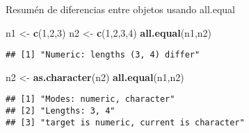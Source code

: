 \documentclass[ignorenonframetext,]{beamer}
\newenvironment{Shaded}{\begin{snugshade}}{\end{snugshade}}
\newcommand{\KeywordTok}[1]{\textcolor[rgb]{0.13,0.29,0.53}{\textbf{#1}}}
\newcommand{\DecValTok}[1]{\textcolor[rgb]{0.00,0.00,0.81}{#1}}
\newcommand{\StringTok}[1]{\textcolor[rgb]{0.31,0.60,0.02}{#1}}
\newcommand{\NormalTok}[1]{#1}
\begin{document}
\begin{frame}[fragile]{Resumén de diferencias entre objetos usando
all.equal}

\begin{Shaded}
\begin{Highlighting}[]
\NormalTok{n1 <-}\StringTok{ }\KeywordTok{c}\NormalTok{(}\DecValTok{1}\NormalTok{,}\DecValTok{2}\NormalTok{,}\DecValTok{3}\NormalTok{)}
\NormalTok{n2 <-}\StringTok{ }\KeywordTok{c}\NormalTok{(}\DecValTok{1}\NormalTok{,}\DecValTok{2}\NormalTok{,}\DecValTok{3}\NormalTok{,}\DecValTok{4}\NormalTok{)}
\KeywordTok{all.equal}\NormalTok{(n1,n2)}
\end{Highlighting}
\end{Shaded}

\begin{verbatim}
## [1] "Numeric: lengths (3, 4) differ"
\end{verbatim}

\begin{Shaded}
\begin{Highlighting}[]
\NormalTok{n2 <-}\StringTok{ }\KeywordTok{as.character}\NormalTok{(n2)}
\KeywordTok{all.equal}\NormalTok{(n1,n2)}
\end{Highlighting}
\end{Shaded}

\begin{verbatim}
## [1] "Modes: numeric, character"              
## [2] "Lengths: 3, 4"                          
## [3] "target is numeric, current is character"
\end{verbatim}

\end{frame}
\end{document}
